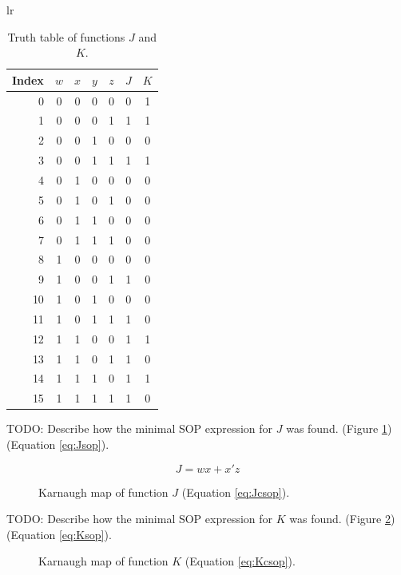 \documentclass[12pt]{article}
\begin{document}
\begin{table}[htb]
\begin{center}
\begin{tabular}{lr}
  \begin{tabular}[t]{r|cccc|c|c}
  Index&$w$&$x$&$y$&$z$&$J$&$K$\\
  \hline
  0  &0&0&0&0 &0 &1\\
  1  &0&0&0&1 &1 &1\\
  2  &0&0&1&0 &0 &0\\
  3  &0&0&1&1 &1 &1\\
  4  &0&1&0&0 &0 &0\\
  5  &0&1&0&1 &0 &0\\
  6  &0&1&1&0 &0 &0\\
  7  &0&1&1&1 &0 &0\\
  8  &1&0&0&0 &0 &0\\
  9  &1&0&0&1 &1 &0\\
  10 &1&0&1&0 &0 &0\\
  11 &1&0&1&1 &1 &0\\
  12 &1&1&0&0 &1 &1\\
  13 &1&1&0&1 &1 &0\\
  14 &1&1&1&0 &1 &1\\
  15 &1&1&1&1 &1 &0\\
  \end{tabular}
\end{tabular}
\end{center}
\caption{Truth table of functions $J$ and $K$.}
\label{tbl:tt}
\end{table}

TODO: Describe how the minimal SOP expression for $J$ was found.
(Figure \ref{fig:Jmap})
(Equation \ref{eq:Jsop}).

\begin{equation}
	J = w x + x' z  \label{eq:Jsop}
\end{equation}

\begin{figure}[!hbt]
\begin{center}
\end{center}
\caption{Karnaugh map of function $J$ (Equation \ref{eq:Jcsop}).}
\label{fig:Jmap}
\end{figure}

TODO: Describe how the minimal SOP expression for $K$ was found.
(Figure \ref{fig:Kmap})
(Equation \ref{eq:Ksop}).

\begin{figure}[!hbt]
\begin{center}
\end{center}
\caption{Karnaugh map of function $K$ (Equation \ref{eq:Kcsop}).}
\label{fig:Kmap}
\end{figure}
\end{document}

